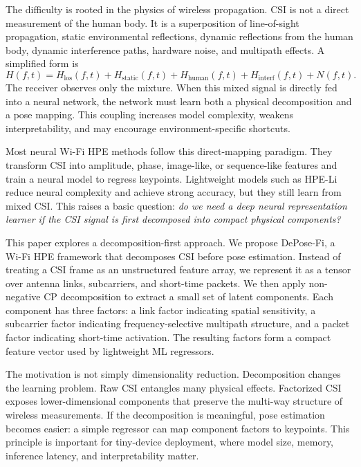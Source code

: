 \documentclass[letterpaper]{article}
\newcommand{\method}{DePose-Fi}
\begin{document}
The difficulty is rooted in the physics of wireless propagation. CSI is not a direct measurement of the human body. It is a superposition of line-of-sight propagation, static environmental reflections, dynamic reflections from the human body, dynamic interference paths, hardware noise, and multipath effects. A simplified form is
\begin{equation}
    H(f,t)
    =
    H_{\mathrm{los}}(f,t)
    +
    H_{\mathrm{static}}(f,t)
    +
    H_{\mathrm{human}}(f,t)
    +
    H_{\mathrm{interf}}(f,t)
    +
    N(f,t).
\end{equation}
The receiver observes only the mixture. When this mixed signal is directly fed into a neural network, the network must learn both a physical decomposition and a pose mapping. This coupling increases model complexity, weakens interpretability, and may encourage environment-specific shortcuts.

Most neural Wi-Fi HPE methods follow this direct-mapping paradigm. They transform CSI into amplitude, phase, image-like, or sequence-like features and train a neural model to regress keypoints. Lightweight models such as HPE-Li reduce neural complexity and achieve strong accuracy, but they still learn from mixed CSI. This raises a basic question: \emph{do we need a deep neural representation learner if the CSI signal is first decomposed into compact physical components?}

This paper explores a decomposition-first approach. We propose \method, a Wi-Fi HPE framework that decomposes CSI before pose estimation. Instead of treating a CSI frame as an unstructured feature array, we represent it as a tensor over antenna links, subcarriers, and short-time packets. We then apply non-negative CP decomposition to extract a small set of latent components. Each component has three factors: a link factor indicating spatial sensitivity, a subcarrier factor indicating frequency-selective multipath structure, and a packet factor indicating short-time activation. The resulting factors form a compact feature vector used by lightweight ML regressors.

The motivation is not simply dimensionality reduction. Decomposition changes the learning problem. Raw CSI entangles many physical effects. Factorized CSI exposes lower-dimensional components that preserve the multi-way structure of wireless measurements. If the decomposition is meaningful, pose estimation becomes easier: a simple regressor can map component factors to keypoints. This principle is important for tiny-device deployment, where model size, memory, inference latency, and interpretability matter.
\end{document}
